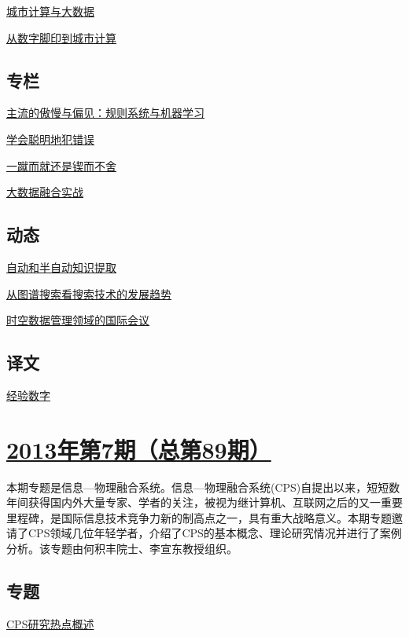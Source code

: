 \documentclass[a4paper]{article}
\begin{document}
\href{http://history.ccf.org.cn/resources/1190201776262/2013/08/16/2.pdf}{城市计算与大数据}

\href{http://history.ccf.org.cn/resources/1190201776262/2013/08/16/3.pdf}{从数字脚印到城市计算}

\subsection{专栏}
\href{http://history.ccf.org.cn/resources/1190201776262/2013/08/16/8.pdf}{主流的傲慢与偏见：规则系统与机器学习}

\href{http://history.ccf.org.cn/resources/1190201776262/2013/08/16/9.pdf}{学会聪明地犯错误}

\href{http://history.ccf.org.cn/resources/1190201776262/2013/08/16/10.pdf}{一蹴而就还是锲而不舍}

\href{http://history.ccf.org.cn/resources/1190201776262/2013/08/16/7.pdf}{大数据融合实战}

\subsection{动态}
\href{http://history.ccf.org.cn/resources/1190201776262/2013/08/16/12.pdf}{自动和半自动知识提取}

\href{http://history.ccf.org.cn/resources/1190201776262/2013/08/16/13.pdf}{从图谱搜索看搜索技术的发展趋势}

\href{http://history.ccf.org.cn/resources/1190201776262/2013/08/16/11.pdf}{时空数据管理领域的国际会议}

\subsection{译文}
\href{http://history.ccf.org.cn/resources/1190201776262/2013/08/16/14.pdf}{经验数字}


\section{\href{http://history.ccf.org.cn/sites/ccf/jsjtbbd.jsp?contentId=2747666950372}{\textbf{2013年第7期（总第89期）}}}
本期专题是信息—物理融合系统。信息—物理融合系统(CPS)自提出以来，短短数年间获得国内外大量专家、学者的关注，被视为继计算机、互联网之后的又一重要里程碑，是国际信息技术竞争力新的制高点之一，具有重大战略意义。本期专题邀请了CPS领域几位年轻学者，介绍了CPS的基本概念、理论研究情况并进行了案例分析。该专题由何积丰院士、李宣东教授组织。
\subsection{专题}
\href{http://history.ccf.org.cn/resources/1190201776262/2013/07/19/1.pdf}{CPS研究热点概述}
\end{document}
